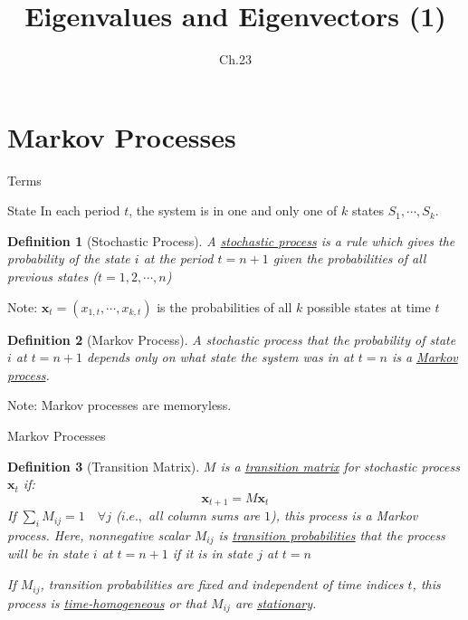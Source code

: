 \documentclass[a4paper,11pt]{article}
\author[조남운]{\mail}
\title{Eigenvalues and Eigenvectors (1)}
\subtitle{Ch.23}
\newtheorem{defn}{Definition}
\newcommand{\bd}{\mathbf}
\begin{document}
	
\maketitle


\setcounter{section}{5}

\section{Markov Processes} %
\label{sec:markov_process}
\begin{frame}[t]{Terms}
	\begin{block}
		{State} In each period $t$, the system is in one and only one of $k$ states $S_1,\cdots,S_k$. 
	\end{block}
	\begin{defn}
		[Stochastic Process]
		A \uline{stochastic process} is a rule which gives the probability of the state $i$ at the period $t=n+1$ given the probabilities of all previous states ($t=1,2,\cdots,n$)
	\end{defn}
	Note: $\bd{x}_t=(x_{1,t},\cdots,x_{k,t})$ is the probabilities of all $k$ possible states at time $t$
	\begin{defn}
		[Markov Process] A stochastic process that the probability of state $i$ at $t=n+1$ depends only on what state the system was in at $t=n$ is a \uline{Markov process}. 
	\end{defn}
	Note: Markov processes are memoryless. 
\end{frame}

\begin{frame}[t]{Markov Processes}
	\begin{defn}
		[Transition Matrix] $M$ is a \uline{transition matrix} for stochastic process $\bd{x}_t$ if: \[
			\bd{x}_{t+1} = M \bd{x}_t
		\]
		If $\sum_{i} M_{ij} = 1 \quad \forall j$ ($i.e.,$ all column sums are $1$), this process is a Markov process. Here, nonnegative scalar $M_{ij}$ is \uline{transition probabilities} that the process will be in state $i$ at $t=n+1$ if it is in state $j$ at $t=n$
		
		If $M_{ij}$, transition probabilities are fixed and independent of time indices $t$, this process is \uline{time-homogeneous} or that $M_{ij}$ are \uline{stationary}.
	\end{defn}
\end{frame}
\end{document}
